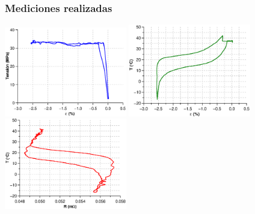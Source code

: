 \documentclass[usenames,dvipsnames]{beamer}
\begin{document}


\begin{frame}

\frametitle{Mediciones realizadas}
        \includegraphics[width=0.4\textwidth]{img/resistencia/EjTensionDef.eps}
        \includegraphics[width=0.4\textwidth]{img/resistencia/EjTempDef.eps}
\newline
        \includegraphics[width=0.4\textwidth]{img/resistencia/EjTempRes.eps}

\end{frame}

\end{document}
